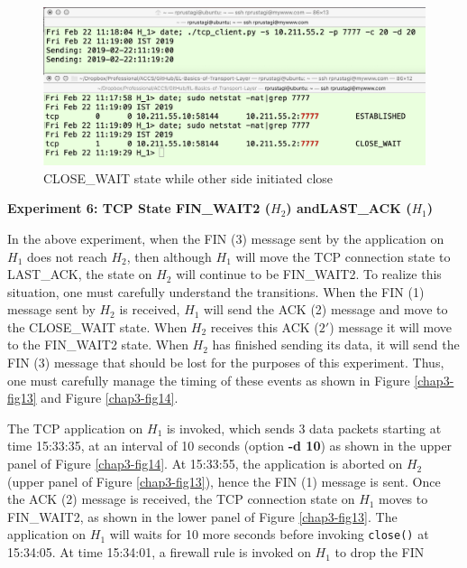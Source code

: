 \begin{figure}[!htb]
\centering
\includegraphics[scale=.45]{src/Figures/chap3/12.jpg}
\caption{CLOSE\_WAIT state while other side initiated close}\label{chap3-fig12}
\end{figure}

\begin{multicols}{2}
\noindent
\textbf{Experiment 6: TCP State FIN\_WAIT2 (\boldmath$H_{2}$) and\hfill\break LAST\_ACK ($H_{1}$)}
\smallskip

In the above experiment, when the FIN (3) message sent by the application on $H_{1}$ does not reach $H_{2}$, then although $H_{1}$ will move the TCP connection state to LAST\_ACK, the state on $H_{2}$ will continue to be FIN\_WAIT2. To realize this situation, one must carefully understand the transitions. When the FIN (1) message sent by $H_{2}$ is received, $H_{1}$ will send the ACK (2) message and move to the CLOSE\_WAIT state. When $H_{2}$ receives this ACK ($2'$) message it will move to the FIN\_WAIT2 state. When $H_{2}$ has finished sending its data, it will send the FIN (3) message that should be lost for the purposes of this experiment. Thus, one must carefully manage the timing of these events as shown in  Figure \ref{chap3-fig13} and Figure \ref{chap3-fig14}.

{\parfillskip=0pt
The TCP application on $H_{1}$ is invoked, which sends 3 data packets starting at time 15:33:35, at an interval of 10 seconds (option \textbf{-d 10}) as shown in the upper panel of Figure \ref{chap3-fig14}. At 15:33:55, the application is aborted on $H_{2}$ (upper panel of Figure \ref{chap3-fig13}), hence the FIN (1) message is sent. Once the ACK (2) message is received, the TCP connection state on $H_{1}$ moves to FIN\_WAIT2, as shown in the lower panel of Figure \ref{chap3-fig13}. The application on $H_{1}$ will waits for 10 more seconds before invoking \lstinline|close()| at 15:34:05. At time 15:34:01, a firewall rule is invoked on $H_{1}$ to drop the FIN\par}
\end{multicols}

